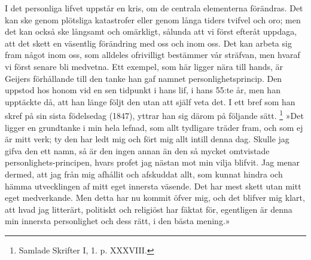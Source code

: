 \documentclass[12pt]{article}
\newcommand{\opage}[1]{\marginnote{\footnotesize\textit{[#1]}}}
\begin{document}
I det personliga lifvet uppstår en kris, om de centrala elementerna förändras. Det kan ske genom plötsliga katastrofer eller genom långa tiders tvifvel och oro; men det kan också ske långsamt och omärkligt, sålunda att vi först efteråt uppdaga, att det skett en väsentlig förändring med oss och inom oss. Det kan arbeta sig fram något inom oss, som alldeles ofrivilligt bestämmer vår sträfvan, men hvaraf vi först senare bli medvetna. Ett exempel, som här ligger nära till hands, är Geijers förhållande till den tanke han gaf namnet personlighetsprincip. Den uppstod hos honom vid en sen tidpunkt i hans lif, i hans 55:te år, men han upptäckte då, att han länge följt den utan att själf veta det. I ett bref som han skref på sin sista födelsedag (1847), yttrar han sig därom på följande sätt. %
\footnote[2]{Samlade Skrifter I, 1. p. XXXVIII.} »Det ligger en grundtanke i min %
\opage{37}
hela lefnad, som allt tydligare träder fram, och som ej är mitt verk; ty den har ledt mig och fört mig allt intill denna dag. Skulle jag gifva den ett namn, så är den ingen annan än den så mycket omtvistade personlighets-principen, hvars profet jag nästan mot min vilja blifvit. Jag menar dermed, att jag från mig afhållit och afskuddat allt, som kunnat hindra och hämma utvecklingen af mitt eget innersta väsende. Det har mest skett utan mitt eget medverkande. Men detta har nu kommit öfver mig, och det blifver mig klart, att hvad jag litterärt, politiskt och religiöst har fäktat för, egentligen är denna min innersta personlighet och dess rätt, i den bästa mening.»
\end{document}
